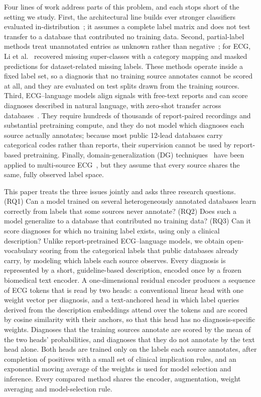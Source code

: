 Four lines of work address parts of this problem, and each stops short of the setting we study. First, the architectural line builds ever stronger classifiers evaluated in-distribution~\cite{zhao2020cinc,nejedly2021,sharan2025,zhou_leadgraph2026,sethi2025proto}; it assumes a complete label matrix and does not test transfer to a database that contributed no training data. Second, partial-label methods treat unannotated entries as unknown rather than negative~\cite{durand2019,benbaruch2022}; for ECG, Li et al.~\cite{li2024} recovered missing super-classes with a category mapping and masked predictions for dataset-related missing labels. These methods operate inside a fixed label set, so a diagnosis that no training source annotates cannot be scored at all, and they are evaluated on test splits drawn from the training sources. Third, ECG--language models align signals with free-text reports and can score diagnoses described in natural language, with zero-shot transfer across databases~\cite{merl2024,suprime2025,melp2025}. They require hundreds of thousands of report-paired recordings and substantial pretraining compute, and they do not model which diagnoses each source actually annotates; because most public 12-lead databases carry categorical codes rather than reports, their supervision cannot be used by report-based pretraining. Finally, domain-generalization (DG) techniques~\cite{ganin2016,sun2016coral,zhou2021mixstyle,sagawa2020} have been applied to multi-source ECG~\cite{ballas2022}, but they assume that every source shares the same, fully observed label space.

This paper treats the three issues jointly and asks three research questions. (RQ1) Can a model trained on several heterogeneously annotated databases learn correctly from labels that some sources never annotate? (RQ2) Does such a model generalize to a database that contributed no training data? (RQ3) Can it score diagnoses for which no training label exists, using only a clinical description? Unlike report-pretrained ECG--language models, we obtain open-vocabulary scoring from the categorical labels that public databases already carry, by modeling which labels each source observes. Every diagnosis is represented by a short, guideline-based description, encoded once by a frozen biomedical text encoder. A one-dimensional residual encoder produces a sequence of ECG tokens that is read by two heads: a conventional linear head with one weight vector per diagnosis, and a text-anchored head in which label queries derived from the description embeddings attend over the tokens and are scored by cosine similarity with their anchors, so that this head has no diagnosis-specific weights. Diagnoses that the training sources annotate are scored by the mean of the two heads' probabilities, and diagnoses that they do not annotate by the text head alone. Both heads are trained only on the labels each source annotates, after completion of positives with a small set of clinical implication rules, and an exponential moving average of the weights is used for model selection and inference. Every compared method shares the encoder, augmentation, weight averaging and model-selection rule.

